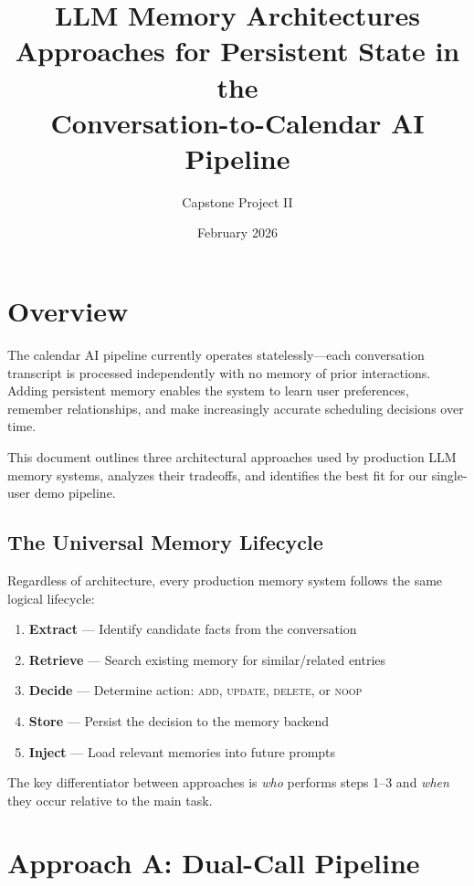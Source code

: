\documentclass[11pt, letterpaper]{article}
\title{\textbf{LLM Memory Architectures}\\[0.3em]
\large Approaches for Persistent State in the\\Conversation-to-Calendar AI Pipeline}
\author{Capstone Project II}
\date{February 2026}
\begin{document}
\maketitle
\thispagestyle{fancy}

\section{Overview}

The calendar AI pipeline currently operates statelessly---each conversation transcript
is processed independently with no memory of prior interactions. Adding persistent memory
enables the system to learn user preferences, remember relationships, and make increasingly
accurate scheduling decisions over time.

This document outlines three architectural approaches used by production LLM memory systems,
analyzes their tradeoffs, and identifies the best fit for our single-user demo pipeline.

\subsection{The Universal Memory Lifecycle}

Regardless of architecture, every production memory system follows the same logical lifecycle:

\begin{enumerate}[leftmargin=2em]
    \item \textbf{Extract} --- Identify candidate facts from the conversation
    \item \textbf{Retrieve} --- Search existing memory for similar/related entries
    \item \textbf{Decide} --- Determine action: \textsc{add}, \textsc{update}, \textsc{delete}, or \textsc{noop}
    \item \textbf{Store} --- Persist the decision to the memory backend
    \item \textbf{Inject} --- Load relevant memories into future prompts
\end{enumerate}

\noindent The key differentiator between approaches is \emph{who} performs steps 1--3
and \emph{when} they occur relative to the main task.

\section{Approach A: Dual-Call Pipeline}
\label{sec:dual-call}
\end{document}
